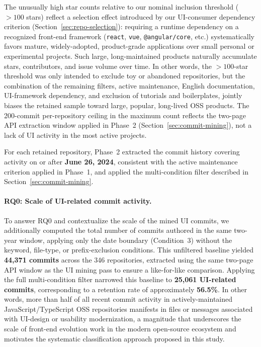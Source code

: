 \documentclass{article}
\begin{document}
The unusually high star counts relative to our nominal inclusion
threshold ($>100$ stars) reflect a selection effect introduced by our
UI-consumer dependency criterion (Section~\ref{sec:repo-selection}):
requiring a runtime dependency on a recognized front-end framework
(\texttt{react}, \texttt{vue}, \texttt{@angular/core}, etc.)
systematically favors mature, widely-adopted, product-grade applications
over small personal or experimental projects. Such large,
long-maintained products naturally accumulate stars, contributors, and
issue volume over time. In other words, the $>100$-star threshold was
only intended to exclude toy or abandoned repositories, but the
combination of the remaining filters, active maintenance, English
documentation, UI-framework dependency, and exclusion of tutorials and
boilerplates, jointly biases the retained sample toward large,
popular, long-lived OSS products. The 200-commit per-repository ceiling
in the maximum count reflects the two-page API extraction window applied
in Phase~2 (Section~\ref{sec:commit-mining}), not a lack of UI activity
in the most active projects.

For each retained repository, Phase~2 extracted the commit history
covering activity on or after \textbf{June 26, 2024}, consistent
with the active maintenance criterion applied in Phase~1, and
applied the multi-condition filter described in
Section~\ref{sec:commit-mining}.

\paragraph{RQ0: Scale of UI-related commit activity.}
To answer RQ0 and contextualize the scale of the mined UI commits, we
additionally computed the total number of commits authored in the same
two-year window, applying only the date boundary (Condition~3) without
the keyword, file-type, or prefix-exclusion conditions. This unfiltered
baseline yielded \textbf{44,371 commits} across the 346 repositories,
extracted using the same two-page API window as the UI mining pass to
ensure a like-for-like comparison. Applying the full multi-condition
filter narrowed this baseline to \textbf{25,061 UI-related commits},
corresponding to a retention rate of approximately \textbf{56.5\%}. In
other words, more than half of all recent commit activity in
actively-maintained JavaScript/TypeScript OSS repositories manifests in
files or messages associated with UI-design or usability modernization, a magnitude that underscores the scale of front-end evolution work
in the modern open-source ecosystem and motivates the systematic
classification approach proposed in this study.
\end{document}
